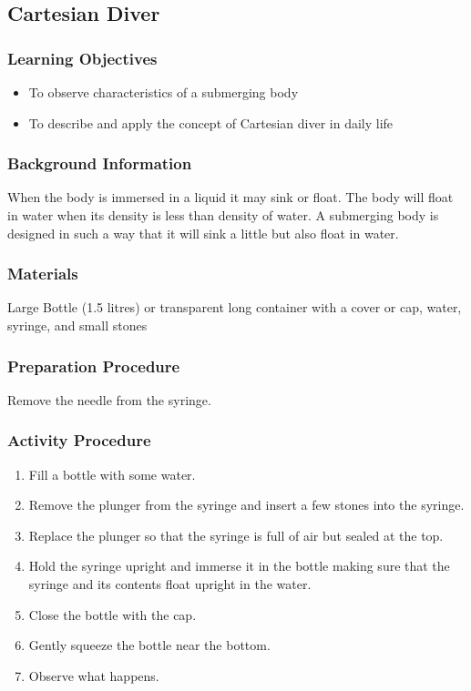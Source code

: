 \subsection{Cartesian Diver}

\subsubsection*{Learning Objectives}
\begin{itemize}
\item{To observe characteristics of a submerging body}
\item{To describe and apply the concept of Cartesian diver in daily life}
\end{itemize}

\subsubsection*{Background Information}
When the body is immersed in a liquid it may sink or float. The body will float in water when its density is less than density of water. A submerging body is designed in such a way that it will sink a little but also float in water. 

\subsubsection*{Materials}
Large Bottle (1.5 litres) or transparent long container with a cover or cap, water, syringe, and small stones

\subsubsection*{Preparation Procedure}
Remove the needle from the syringe.

\subsubsection*{Activity Procedure}
\begin{enumerate}
\item{Fill a bottle with some water.}
\item{Remove the plunger from the syringe and insert a few stones into the syringe.}
\item{Replace the plunger so that the syringe is full of air but sealed at the top.} 
\item{Hold the syringe upright and immerse it in the bottle making sure that the syringe and its contents float upright in the water.}
\item{Close the bottle with the cap.}
\item{Gently squeeze the bottle near the bottom.} 
\item{Observe what happens.}
\end{enumerate}

